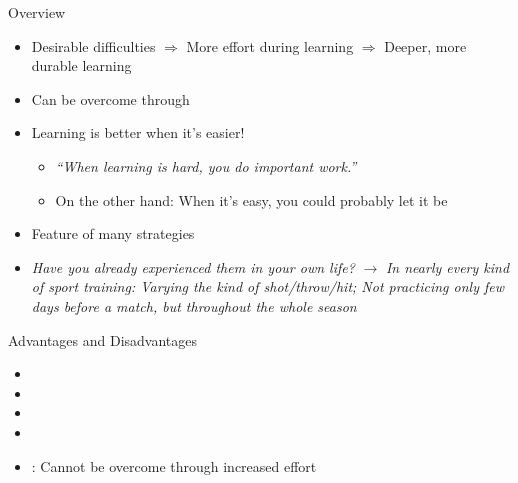\documentclass{ercisbeamer}
\begin{document}
\begin{frame}{Overview}
    \begin{tbox}
        \begin{itemize}
            \item Desirable difficulties $\Rightarrow$ More effort during learning $\Rightarrow$ Deeper, more durable learning
            \item Can be overcome through 
            \item Learning is  better when it's easier!
            \begin{itemize}
                \item \emph{``When learning is hard, you do important work.'' }
                \item On the other hand: When it's easy, you could probably let it be
            \end{itemize}
            \item Feature of many  strategies 
            \item \emph{Have you already experienced them in your own life?} \pause $\rightarrow$ \emph{In nearly every kind of sport training: Varying the kind of shot/throw/hit; Not practicing only few days before a match, but throughout the whole season}
        \end{itemize}
    \end{tbox}
\end{frame}
\setbgimage{}

\begin{frame}{Advantages and Disadvantages}
    \begin{itemize}
        \item {} 
        \item {} 
        \item {}
        \item {} 
        \item {}: Cannot be overcome through increased effort
    \end{itemize}
\end{frame}
\end{document}
